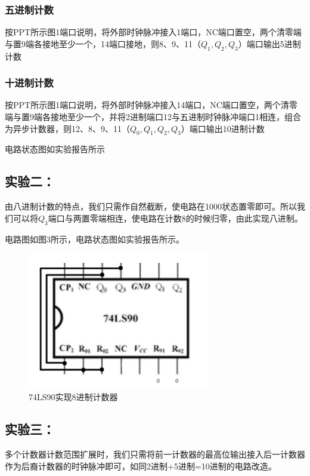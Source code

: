 \documentclass[a4paper,11pt,UTF8]{ctexart}
\begin{document}
\subsubsection{五进制计数}
	按PPT所示图1端口说明，将外部时钟脉冲接入1端口，NC端口置空，两个清零端与置9端各接地至少一个，14端口接地，则8、9、11（$Q_1, Q_2, Q_3$）端口输出5进制计数
	
\subsubsection{十进制计数}
	按PPT所示图1端口说明，将外部时钟脉冲接入14端口，NC端口置空，两个清零端与置9端各接地至少一个，并将2进制端口12与五进制时钟脉冲端口1相连，组合为异步计数器，则12、8、9、11（$Q_0,Q_1, Q_2, Q_3$）端口输出10进制计数
	
	
	
	
	
	电路状态图如实验报告所示


 \subsection{实验二：\expb}
 由八进制计数的特点，我们只需作自然截断，使电路在1000状态置零即可。所以我们可以将$Q_3$端口与两置零端相连，使电路在计数8的时候归零，由此实现八进制。
 
 电路图如图3所示，电路状态图如实验报告所示。
 \begin{figure}[H]
  \centering
  \includegraphics[width=8cm]{jsq3}
  \caption{74LS90实现8进制计数器}
  \label{fig:jsq3}
 \end{figure}
 
 \subsection{实验三：\expc}
 多个计数器计数范围扩展时，我们只需将前一计数器的最高位输出接入后一计数器作为后裔计数器的时钟脉冲即可，如同2进制+5进制=10进制的电路改造。
 
\end{document}
